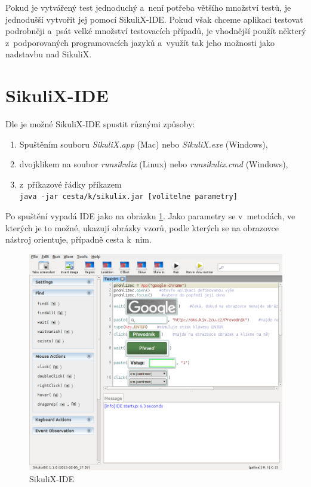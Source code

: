 	Pokud je vytvářený test jednoduchý a~není potřeba většího množství testů, je jednodušší vytvořit jej pomocí SikuliX-IDE. Pokud však chceme aplikaci testovat podrobněji a~psát velké množství testovacích případů, je vhodnější použít některý z~podporovaných programovacích jazyků a~využít tak jeho možnosti jako nadstavbu nad SikuliX.
	
	\section{SikuliX-IDE}
	Dle \citep{SikuliX} je možné SikuliX-IDE spustit různými způsoby:
	\begin{enumerate}
		\item Spuštěním souboru \emph{SikuliX.app} (Mac) nebo \emph{SikuliX.exe} (Windows),
		\item dvojklikem na soubor \emph{runsikulix} (Linux) nebo \emph{runsikulix.cmd} (Windows),
		\item z~příkazové řádky příkazem\\
		\texttt{java -jar cesta/k/sikulix.jar [volitelne parametry]}
	\end{enumerate}
	Po spuštění vypadá IDE jako na obrázku \ref{SikuliXIDE}. Jako parametry se v~metodách, ve kterých je to možné, ukazují obrázky vzorů, podle kterých se na obrazovce nástroj orientuje, případně cesta k~nim.
	\begin{figure}[ht!]
		\centering
		\caption{SikuliX-IDE}
		\label{SikuliXIDE}
		\includegraphics[width=13.5cm]{img/SikuliXIDE.png}
	\end{figure}
	
